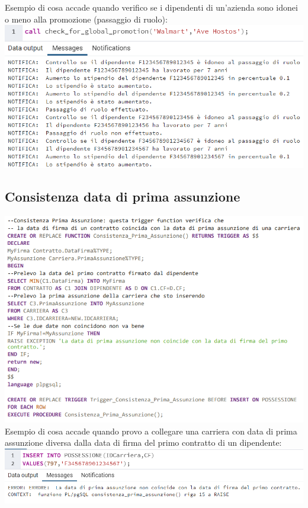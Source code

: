 \newpage
Esempio di cosa accade quando verifico se i dipendenti di un'azienda
sono idonei o meno alla promozione (passaggio di ruolo):
\newline\newline
\includegraphics[width=1\textwidth]{Immagini/idonei.png}
\subsection{Consistenza data di prima assunzione}
\includegraphics[width=1\textwidth]{Immagini/consistenzadate.sql}
\newpage
Esempio di cosa accade quando provo a collegare una carriera con data di prima assunzione
diversa dalla data di firma del primo contratto di un dipendente:
\newline\newline
\includegraphics[width=1\textwidth]{Immagini/consdatees}
